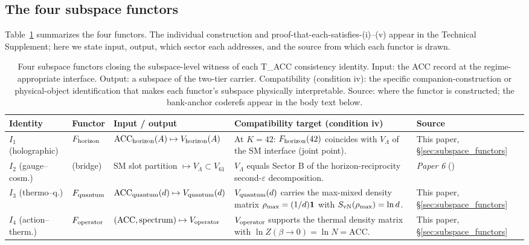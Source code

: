 \documentclass[11pt]{article}
\newcommand{\paperref}[2]{\emph{Paper #1} (\emph{#2})}
\begin{document}
\subsection{The four subspace functors}\label{sec:subspace_functors_catalog}

Table~\ref{tab:subspace_functors} summarizes the four functors. The individual construction and proof-that-each-satisfies-(i)--(v) appear in the Technical Supplement; here we state input, output, which sector each addresses, and the source from which each functor is drawn.

\begin{table}[h]
\centering
\small
\begin{tabularx}{\textwidth}{@{}l l l X l@{}}
\toprule
\textbf{Identity} & \textbf{Functor} & \textbf{Input / output} & \textbf{Compatibility target (condition iv)} & \textbf{Source} \\
\midrule
$I_1$ (holographic) &
    $F_{\rm horizon}$ &
    $\mathrm{ACC}_{\rm horizon}(A) \mapsto V_{\rm horizon}(A)$ &
    At $K=42$: $F_{\rm horizon}(42)$ coincides with $V_\Lambda$ of the SM interface (joint point). &
    This paper, \S\ref{sec:subspace_functors} \\
\addlinespace[3pt]
$I_2$ (gauge--cosm.) &
    (bridge) &
    SM slot partition $\mapsto V_\Lambda \subset V_{61}$ &
    $V_\Lambda$ equals Sector B of the horizon-reciprocity second-$\varepsilon$ decomposition. &
    \paperref{6}{} \\
\addlinespace[3pt]
$I_3$ (thermo--q.) &
    $F_{\rm quantum}$ &
    $\mathrm{ACC}_{\rm quantum}(d) \mapsto V_{\rm quantum}(d)$ &
    $V_{\rm quantum}(d)$ carries the max-mixed density matrix $\rho_{\rm max} = (1/d)\mathbf{1}$ with $S_{\rm vN}(\rho_{\rm max}) = \ln d$. &
    This paper, \S\ref{sec:subspace_functors} \\
\addlinespace[3pt]
$I_4$ (action--therm.) &
    $F_{\rm operator}$ &
    $(\mathrm{ACC}, \text{spectrum}) \mapsto V_{\rm operator}$ &
    $V_{\rm operator}$ supports the thermal density matrix with $\ln Z(\beta\!\to\!0) = \ln N = \mathrm{ACC}$. &
    This paper, \S\ref{sec:subspace_functors} \\
\bottomrule
\end{tabularx}
\caption{Four subspace functors closing the subspace-level witness of each T\_ACC consistency identity. Input: the ACC record at the regime-appropriate interface. Output: a subspace of the two-tier carrier. Compatibility (condition iv): the specific companion-construction or physical-object identification that makes each functor's subspace physically interpretable. Source: where the functor is constructed; the bank-anchor coderefs appear in the body text below.}\label{tab:subspace_functors}
\end{table}
\end{document}
